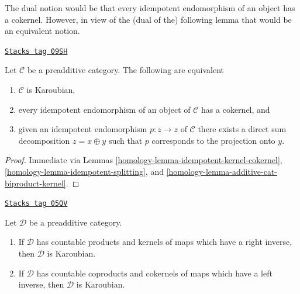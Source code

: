 The dual notion would be that every idempotent endomorphism of an
object has a cokernel. However, in view of the (dual of the)
following lemma that would be an equivalent notion.

\begin{lemma}[Karoubian]
\label{homology-lemma-karoubian}
\href{https://stacks.math.columbia.edu/tag/09SH}{\texttt{Stacks tag 09SH}}

Let $\mathcal{C}$ be a preadditive category. The following
are equivalent
\begin{enumerate}
\item $\mathcal{C}$ is Karoubian,
\item every idempotent endomorphism of an object of $\mathcal{C}$ has a
cokernel, and
\item given an idempotent endomorphism $p : z \to z$ of $\mathcal{C}$
there exists a direct sum decomposition $z = x \oplus y$ such
that $p$ corresponds to the projection onto $y$.
\end{enumerate}
\end{lemma}

\begin{proof}

Immediate via Lemmas \ref{homology-lemma-idempotent-kernel-cokernel},
\ref{homology-lemma-idempotent-splitting}, and \ref{homology-lemma-additive-cat-biproduct-kernel}.
\end{proof}

\begin{lemma}
\label{homology-lemma-projectors-have-images}
\href{https://stacks.math.columbia.edu/tag/05QV}{\texttt{Stacks tag 05QV}}

Let $\mathcal{D}$ be a preadditive category.
\begin{enumerate}
\item If $\mathcal{D}$ has countable products and kernels of maps which
have a right inverse, then $\mathcal{D}$ is Karoubian.
\item If $\mathcal{D}$ has countable coproducts and cokernels of
maps which have a left inverse, then $\mathcal{D}$ is Karoubian.
\end{enumerate}
\end{lemma}

